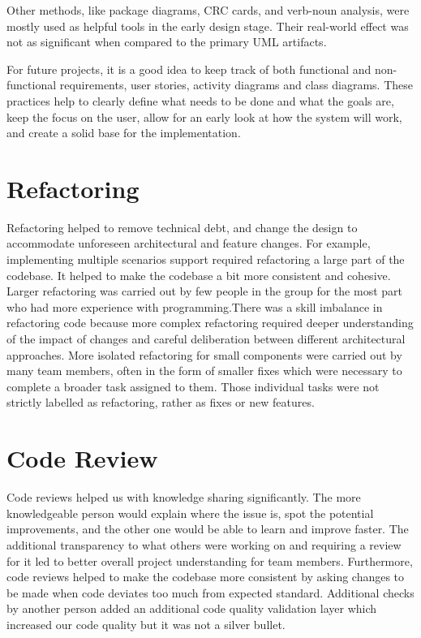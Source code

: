 Other methods, like package diagrams, CRC cards, and verb-noun analysis, were mostly used as helpful tools in the early design stage. Their real-world effect was not as significant when compared to the primary UML artifacts.\par

For future projects, it is a good idea to keep track of both functional and non-functional requirements, user stories, activity diagrams and class diagrams. These practices help to clearly define what needs to be done and what the goals are, keep the focus on the user, allow for an early look at how the system will work, and create a solid base for the implementation.\par

\section{Refactoring}

Refactoring helped to remove technical debt, and change the design to accommodate unforeseen architectural and feature changes. For example, implementing multiple scenarios support required refactoring a large part of the codebase. It helped to make the codebase a bit more consistent and cohesive. Larger refactoring was carried out by few people in the group for the most part who had more experience with programming.There was a skill imbalance in refactoring code because more complex refactoring required deeper understanding of the impact of changes and careful deliberation between different architectural approaches. More isolated refactoring for small components were carried out by many team members, often in the form of smaller fixes which were necessary to complete a broader task assigned to them. Those individual tasks were not strictly labelled as refactoring, rather as fixes or new features.

\section{Code Review}

Code reviews helped us with knowledge sharing significantly. The more knowledgeable person would explain where the issue is, spot the potential improvements, and the other one would be able to learn and improve faster. The additional transparency to what others were working on and requiring a review for it led to better overall project understanding for team members. Furthermore, code reviews helped to make the codebase more consistent by asking changes to be made when code deviates too much from expected standard. Additional checks by another person added an additional code quality validation layer which increased our code quality but it was not a silver bullet.\par

